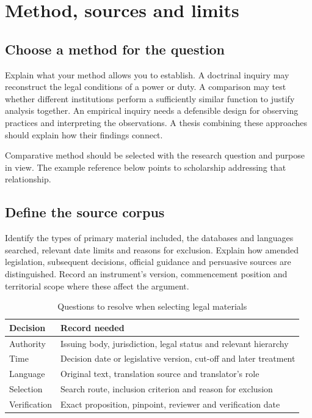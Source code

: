 \chapter{Method, sources and limits}\label{ch:methods}
\section{Choose a method for the question}
Explain what your method allows you to establish. A doctrinal inquiry may
reconstruct the legal conditions of a power or duty. A comparison may test
whether different institutions perform a sufficiently similar function to
justify analysis together. An empirical inquiry needs a defensible design for
observing practices and interpreting the observations. A thesis combining these
approaches should explain how their findings connect.

Comparative method should be selected with the research question and purpose
in view. The example reference below points to scholarship addressing that
relationship.

\section{Define the source corpus}
Identify the types of primary material included, the databases and languages
searched, relevant date limits and reasons for exclusion. Explain how amended
legislation, subsequent decisions, official guidance and persuasive sources
are distinguished. Record an instrument's version, commencement position and
territorial scope where these affect the argument.

\begin{table}[htbp]
\centering\small
\caption{Questions to resolve when selecting legal materials}\label{tab:corpus}
\begin{tabularx}{\textwidth}{@{}p{}X@{}}
\toprule
Decision & Record needed \\
\midrule
Authority & Issuing body, jurisdiction, legal status and relevant hierarchy \\
Time & Decision date or legislative version, cut-off and later treatment \\
Language & Original text, translation source and translator's role \\
Selection & Search route, inclusion criterion and reason for exclusion \\
Verification & Exact proposition, pinpoint, reviewer and verification date \\
\bottomrule
\end{tabularx}
\end{table}

